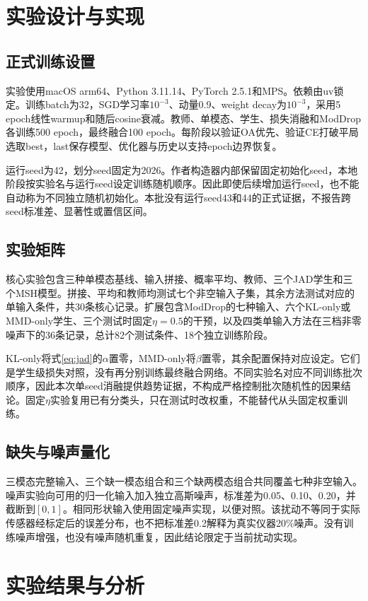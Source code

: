 \documentclass[conference,10pt]{IEEEtran}
\begin{document}
\section{实验设计与实现}
\subsection{正式训练设置}
实验使用macOS arm64、Python 3.11.14、PyTorch 2.5.1和MPS。依赖由uv锁定。训练batch为32，SGD学习率$10^{-3}$、动量0.9、weight decay为$10^{-3}$，采用5 epoch线性warmup和随后cosine衰减。教师、单模态、学生、损失消融和ModDrop各训练500 epoch，最终融合100 epoch。每阶段以验证OA优先、验证CE打破平局选取best，last保存模型、优化器与历史以支持epoch边界恢复。

运行seed为42，划分seed固定为2026。作者构造器内部保留固定初始化seed，本地阶段按实验名与运行seed设定训练随机顺序。因此即使后续增加运行seed，也不能自动称为不同独立随机初始化。本批没有运行seed43和44的正式证据，不报告跨seed标准差、显著性或置信区间。

\subsection{实验矩阵}
核心实验包含三种单模态基线、输入拼接、概率平均、教师、三个JAD学生和三个MSH模型。拼接、平均和教师均测试七个非空输入子集，其余方法测试对应的单输入条件，共30条核心记录。扩展包含ModDrop的七种输入、六个KL-only或MMD-only学生、三个测试时固定$\eta=0.5$的干预，以及四类单输入方法在三档非零噪声下的36条记录，总计82个测试条件、18个独立训练阶段。

KL-only将式\eqref{eq:jad}的$\alpha$置零，MMD-only将$\beta$置零，其余配置保持对应设定。它们是学生级损失对照，没有再分别训练最终融合网络。不同实验名对应不同训练批次顺序，因此本次单seed消融提供趋势证据，不构成严格控制批次随机性的因果结论。固定$\eta$实验复用已有分类头，只在测试时改权重，不能替代从头固定权重训练。

\subsection{缺失与噪声量化}
三模态完整输入、三个缺一模态组合和三个缺两模态组合共同覆盖七种非空输入。噪声实验向可用的归一化输入加入独立高斯噪声，标准差为0.05、0.10、0.20，并截断到$[0,1]$。相同形状输入使用固定噪声实现，以便对照。该扰动不等同于实际传感器经标定后的误差分布，也不把标准差0.2解释为真实仪器20\%噪声。没有训练噪声增强，也没有噪声随机重复，因此结论限定于当前扰动实现。

\section{实验结果与分析}
\end{document}
